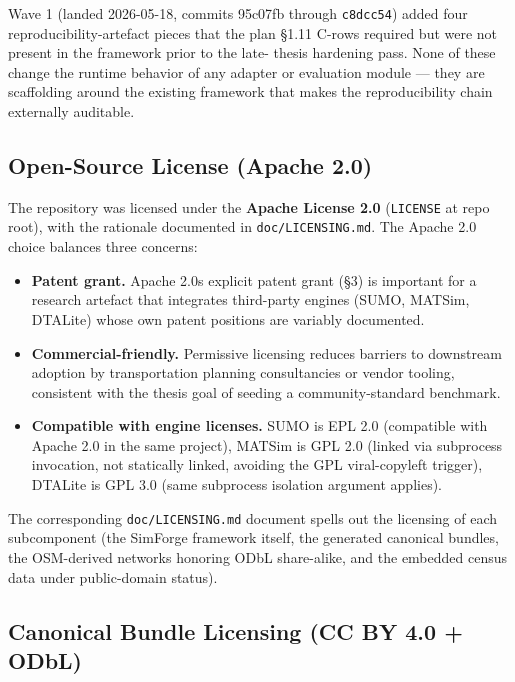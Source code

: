 Wave 1 (landed 2026-05-18, commits 95c07fb through \texttt{c8dcc54})
added four reproducibility-artefact pieces that the plan §1.11
C-rows required but were not present in the framework prior to the late-
thesis hardening pass. None of these change the runtime behavior of any
adapter or evaluation module --- they are scaffolding around the
existing framework that makes the reproducibility chain externally
auditable.

\subsection{Open-Source License (Apache
2.0)}\label{3101-open-source-license-apache-20}

The repository was licensed under the \textbf{Apache License 2.0}
(\texttt{LICENSE} at repo root), with the rationale documented in
\texttt{doc/LICENSING.md}. The Apache 2.0 choice balances three
concerns:

\begin{itemize}
\tightlist
\item
  \textbf{Patent grant.} Apache 2.0\textquotesingle s explicit patent
  grant (§3) is important for a research artefact that integrates
  third-party engines (SUMO, MATSim, DTALite) whose own patent positions
  are variably documented.
\item
  \textbf{Commercial-friendly.} Permissive licensing reduces barriers to
  downstream adoption by transportation planning consultancies or vendor
  tooling, consistent with the thesis goal of seeding a
  community-standard benchmark.
\item
  \textbf{Compatible with engine licenses.} SUMO is EPL 2.0 (compatible
  with Apache 2.0 in the same project), MATSim is GPL 2.0 (linked via
  subprocess invocation, not statically linked, avoiding the GPL
  viral-copyleft trigger), DTALite is GPL 3.0 (same subprocess isolation
  argument applies).
\end{itemize}

The corresponding \texttt{doc/LICENSING.md} document spells out the
licensing of each subcomponent (the SimForge framework itself, the
generated canonical bundles, the OSM-derived networks honoring ODbL
share-alike, and the embedded census data under public-domain status).

\subsection{Canonical Bundle Licensing (CC BY 4.0 +
ODbL)}\label{3102-canonical-bundle-licensing-cc-by-40--odbl}


